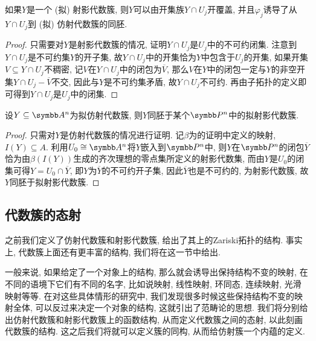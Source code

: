 \begin{proposition}\label{prop:projvarietyopencoverhomeo}
  如果$Y$是一个 (拟) 射影代数簇, 则$Y$可以由开集族$Y\cap U_j$开覆盖, 并且$\varphi_j$诱导了从$Y\cap U_j$到 (拟) 仿射代数簇的同胚.
\end{proposition}

\begin{proof}
  只需要对$Y$是射影代数簇的情况, 证明$Y\cap U_j$是$U_j$中的不可约闭集. 注意到$Y\cap U_j$是不可约集$Y$的开子集, 故$Y\cap U_j$中的开集恰为$Y$中包含于$U_j$的开集, 如果开集$V\subseteq Y\cap U_j$不稠密, 记$V$在$Y\cap U_j$中的闭包为$\overline{V}$, 那么$V$在$Y$中的闭包一定与$Y$的非空开集$Y\cap U_j-\overline{V}$不交, 因此与$Y$是不可约集矛盾, 故$Y\cap U_j$不可约. 再由子拓扑的定义即可得到$Y\cap U_j$是$U_j$中的闭集.
\end{proof}

\begin{proposition}
  设$Y\subseteq \AF^n$为拟仿射代数簇, 则$Y$同胚于某个$\PP^n$中的拟射影代数簇.
\end{proposition}

\begin{proof}
  只需对$Y$是仿射代数簇的情况进行证明. 记$\beta$为的证明中定义的映射, $I(Y)\subseteq A$. 利用$U_0\cong\AF^n$将$Y$嵌入到$\PP^n$中, 则$Y$在$\PP^n$的闭包$\overline{Y}$恰为由$\beta (I(Y))$生成的齐次理想的零点集所定义的射影代数集, 而由$Y$是$U_0$的闭集可得$Y=U_0\cap \overline{Y}$, 即$Y$为$\overline{Y}$的不可约开子集, 因此$\overline{Y}$也是不可约的, 为射影代数簇, 故$Y$同胚于拟射影代数簇.
\end{proof}

\subsection{代数簇的态射}

之前我们定义了仿射代数簇和射影代数簇, 给出了其上的Zariski拓扑的结构. 事实上, 代数簇上面还有更丰富的结构, 我们将在这一节中给出.

一般来说, 如果给定了一个对象上的结构, 那么就会诱导出保持结构不变的映射, 在不同的语境下它们有不同的名字, 比如说映射, 线性映射, 环同态, 连续映射, 光滑映射等等. 在对这些具体情形的研究中, 我们发现很多时候这些保持结构不变的映射全体, 可以反过来决定一个对象的结构, 这就引出了范畴论的思想. 我们将分别给出仿射代数簇和射影代数簇上的函数结构, 从而定义代数簇之间的态射, 以此刻画代数簇的结构. 这之后我们将就可以定义簇的同构, 从而给仿射簇一个内蕴的定义.

